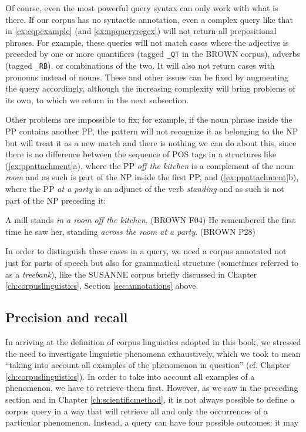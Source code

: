 Of course, even the most powerful query syntax can only work with what is there. If our corpus has no syntactic annotation, even a complex query like that in \ref{ex:cqpexample} (and \ref{ex:npqueryregex}) will not return all prepositional phrases. For example, these queries will not match cases where the adjective is preceded by one or more quantifiers (tagged \texttt{\_QT} in the BROWN corpus), adverbs (tagged \texttt{\_RB}), or combinations of the two. It will also not return cases with pronouns instead of nouns. These and other issues can be fixed by augmenting the query accordingly, although the increasing complexity will bring problems of its own, to which we return in the next subsection.

Other problems are impossible to fix; for example, if the noun phrase inside the PP contains another PP, the pattern will not recognize it as belonging to the NP but will treat it as a new match and there is nothing we can do about this, since there is no difference between the sequence of POS tags in a structures like (\ref{ex:ppattachment}a), where the PP \textit{off the kitchen} is a complement of the noun \textit{room} and as such is part of the NP inside the first PP, and (\ref{ex:ppattachment}b), where the PP \textit{at a party} is an adjunct of the verb \textit{standing} and as such is not part of the NP preceding it:

\begin{exe}
\ex
\begin{xlist} 
\label{ex:ppattachment}
\ex A mill stands \textit{in a room off the kitchen}. (BROWN F04)
\ex He remembered the first time he saw her, standing \textit{across the room at a party}. (BROWN P28)
\end{xlist}
\end{exe}

In order to distinguish these cases in a query, we need a corpus annotated not just for parts of speech but also for grammatical structure (sometimes referred to as a \textit{treebank}), like the SUSANNE corpus briefly discussed in Chapter \ref{ch:corpuslinguistics}, Section \ref{sec:annotations} above.


\subsection{Precision and recall}
\label{sec:precisionrecall}

In arriving at the definition of corpus linguistics adopted in this book, we stressed the need to investigate linguistic phenomena exhaustively, which we took to mean ``taking into account all examples of the phenomenon in question'' (cf. Chapter \ref{ch:corpuslinguistics}). In order to take into account all examples of a phenomenon, we have to retrieve them first. However, as we saw in the preceding section and in Chapter \ref{ch:scientificmethod}, it is not always possible to define a corpus query in a way that will retrieve all and only the occurrences of a particular phenomenon. Instead, a query can have four possible outcomes: it may

